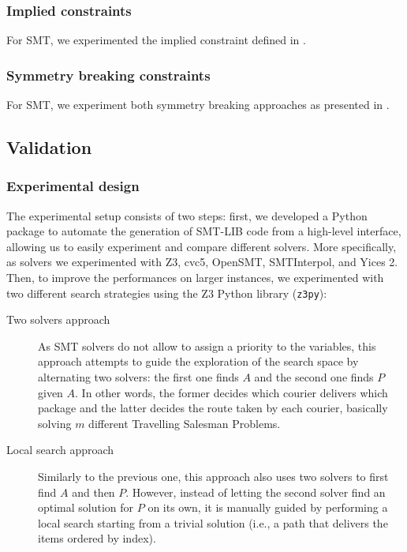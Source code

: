 \subsubsection{Implied constraints}
For SMT, we experimented the implied constraint defined in .


\subsubsection{Symmetry breaking constraints}
For SMT, we experiment both symmetry breaking approaches as presented in .



\subsection{Validation}


\subsubsection{Experimental design}

The experimental setup consists of two steps: first, we developed a Python package to automate the generation of SMT-LIB code from a high-level interface, allowing us to easily experiment and compare different solvers. More specifically, as solvers we experimented with Z3, cvc5, OpenSMT, SMTInterpol, and Yices 2. Then, to improve the performances on larger instances, we experimented with two different search strategies using the Z3 Python library (\texttt{z3py}):
\begin{description}
    \item[Two solvers approach]
        As SMT solvers do not allow to assign a priority to the variables, this approach attempts to guide the exploration of the search space by alternating two solvers: the first one finds $A$ and the second one finds $P$ given $A$. In other words, the former decides which courier delivers which package and the latter decides the route taken by each courier, basically solving $m$ different Travelling Salesman Problems. 

    \item[Local search approach]
        Similarly to the previous one, this approach also uses two solvers to first find $A$ and then $P$. However, instead of letting the second solver find an optimal solution for $P$ on its own, it is manually guided by performing a local search starting from a trivial solution (i.e., a path that delivers the items ordered by index).
\end{description}


